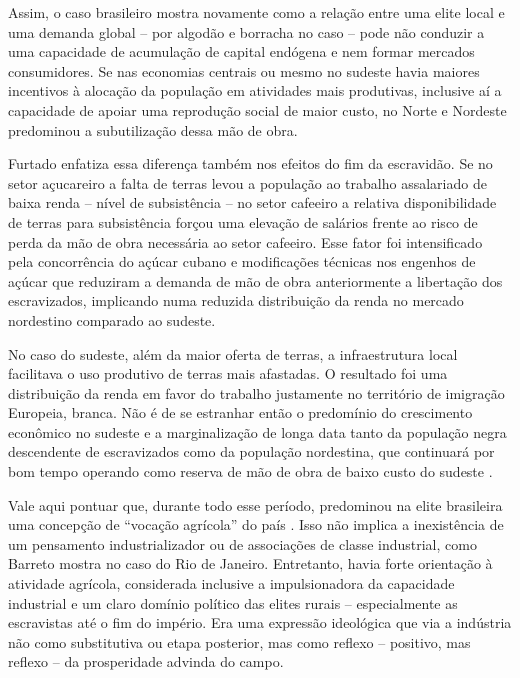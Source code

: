 Assim, o caso brasileiro mostra novamente como a relação entre uma elite
local e uma demanda global -- por algodão e borracha no caso -- pode não
conduzir a uma capacidade de acumulação de capital endógena e nem formar
mercados consumidores. Se nas economias centrais ou mesmo no sudeste
havia maiores incentivos à alocação da população em atividades mais
produtivas, inclusive aí a capacidade de apoiar uma reprodução social de
maior custo, no Norte e Nordeste predominou a subutilização dessa mão de
obra.

Furtado \citeyearpar{furtado2005}
enfatiza essa diferença também nos efeitos do fim da escravidão. Se no
setor açucareiro a falta de terras levou a população ao trabalho
assalariado de baixa renda -- nível de subsistência -- no setor cafeeiro
a relativa disponibilidade de terras para subsistência forçou uma
elevação de salários frente ao risco de perda da mão de obra necessária
ao setor cafeeiro. Esse fator foi intensificado pela concorrência do
açúcar cubano e modificações técnicas nos engenhos de açúcar que
reduziram a demanda de mão de obra anteriormente a libertação dos
escravizados, implicando numa reduzida distribuição da renda no mercado
nordestino comparado ao sudeste.

No caso do sudeste, além da maior oferta de terras, a infraestrutura
local facilitava o uso produtivo de terras mais afastadas. O resultado
foi uma distribuição da renda em favor do trabalho justamente no
território de imigração Europeia, branca. Não é de se estranhar então
o predomínio do crescimento econômico no sudeste e a 
marginalização de longa data tanto da população negra descendente de
escravizados como da população nordestina, que continuará por bom tempo
operando como reserva de mão de obra de baixo custo do sudeste .

Vale aqui pontuar que, durante todo esse período, predominou na elite
brasileira uma concepção de ``vocação agrícola'' do país \citep{curado_industrializacao_2013}.
Isso não implica a inexistência de um pensamento industrializador ou de
associações de classe industrial, como Barreto \citeyearpar{barreto_o_2018} mostra no caso do
Rio de Janeiro. Entretanto, havia forte orientação à atividade agrícola,
considerada inclusive a impulsionadora da capacidade industrial
\citep{barreto_o_2018} e um claro domínio 
político das elites rurais -- especialmente as escravistas até o fim do império. 
Era uma expressão ideológica que via a indústria não como substitutiva ou 
etapa posterior, mas como reflexo -- positivo, mas reflexo -- da prosperidade 
advinda do campo.

